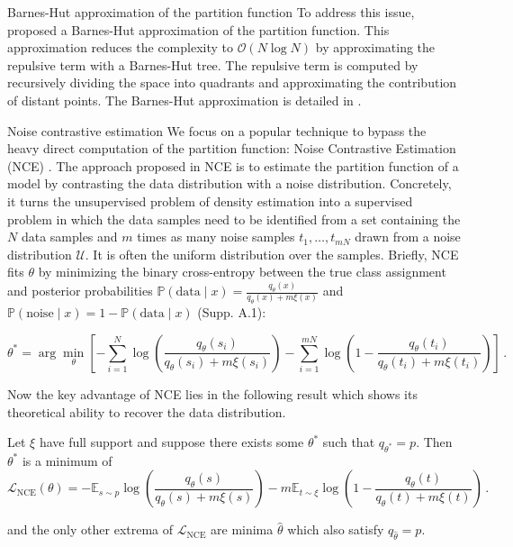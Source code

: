 \begin{mem1}{Barnes-Hut approximation of the partition function}\label{mem:Barnes-Hut}
    To address this issue, \citet{van2008visualizing} proposed a Barnes-Hut approximation of the partition function. This approximation reduces the complexity to $\mathcal{O}(N \log N)$ by approximating the repulsive term with a Barnes-Hut tree. The repulsive term is computed by recursively dividing the space into quadrants and approximating the contribution of distant points. The Barnes-Hut approximation is detailed in .
\end{mem1}

\begin{mem1}{Noise contrastive estimation}\label{mem:NCE}
    We focus on a popular technique to bypass the heavy direct computation of the partition function: Noise Contrastive Estimation (NCE) \citep{gutmann2010noise}. The approach proposed in NCE is to estimate the partition function of a model by contrasting the data distribution with a noise distribution.
    Concretely, it turns the unsupervised problem of density estimation into a supervised problem in which the data samples need to be identified from a set containing the $N$ data samples and $m$ times as many noise samples $t_1, \dots, t_{mN}$ drawn from a noise distribution $\mathcal{U}$. It is often the uniform distribution over the samples. Briefly, NCE fits $\theta$ by minimizing the binary cross-entropy between the true class assignment and posterior probabilities $\mathbb{P}(\text{data} \mid x) = \frac{q_{\theta}(x)}{q_{\theta}(x) + m\xi(x)}$ and $\mathbb{P}(\text{noise} \mid x) = 1 - \mathbb{P}(\text{data} \mid x)$ (Supp. A.1):

    \begin{equation}
    \theta^* = \arg\min_{\theta} \left[ - \sum_{i=1}^{N} \log \left( \frac{q_{\theta}(s_i)}{q_{\theta}(s_i) + m\xi(s_i)} \right) - \sum_{i=1}^{mN} \log \left( 1 - \frac{q_{\theta}(t_i)}{q_{\theta}(t_i) + m\xi(t_i)} \right) \right] \, . \tag{2}
    \end{equation}
    
    Now the key advantage of NCE lies in the following result which shows its theoretical ability to recover the data distribution.
    
    \begin{theorem}
    Let $\xi$ have full support and suppose there exists some $\theta^*$ such that $q_{\theta^*} = p$. Then $\theta^*$ is a minimum of
    \begin{equation}
    \mathcal{L}_{\text{NCE}}(\theta) = - \mathbb{E}_{s \sim p} \log \left( \frac{q_{\theta}(s)}{q_{\theta}(s) + m\xi(s)} \right) - m \mathbb{E}_{t \sim \xi} \log \left( 1 - \frac{q_{\theta}(t)}{q_{\theta}(t) + m\xi(t)} \right) \, . \tag{3}
    \end{equation}

    and the only other extrema of $\mathcal{L}_{\text{NCE}}$ are minima $\hat{\theta}$ which also satisfy $q_{\hat{\theta}} = p$.
    \end{theorem}

\end{mem1}

